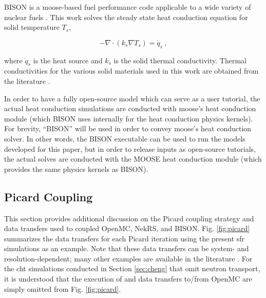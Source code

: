 \documentclass[3p,,preprint,11pt]{elsarticle}
\begin{document}
BISON is a \gls{moose}-based fuel performance code applicable to a wide variety of nuclear fuels \cite{bison}. This work solves the steady state heat conduction equation for solid temperature $T_s$,

\begin{equation}
-\nabla\cdot\left(k_s\nabla T_s\right)=\dot{q}_s\ ,
\end{equation}

\noindent where $\dot{q}_s$ is the heat source and $k_s$ is the solid thermal conductivity. Thermal conductivities for the various solid materials used in this work are obtained from the literature \cite{godbee,powell,bn,tinte,leibowitz,bison}.

In order to have a fully open-source model which can serve as a user tutorial, the actual heat conduction simulations are conducted with \gls{moose}'s heat conduction module (which BISON uses internally for the heat conduction physics kernels). For brevity, ``BISON'' will be used in order to convey \gls{moose}'s heat conduction solver. In other words, the BISON executable can be used to run the models developed for this paper, but in order to release inputs as open-source tutorials, the actual solves are conducted with the MOOSE heat conduction module (which provides the same physics kernels as BISON).

\subsection{Picard Coupling}
\label{sec:picard}


This section provides additional discussion on the Picard coupling strategy and data transfers used to coupled OpenMC, NekRS, and BISON.
Fig. \ref{fig:picard} summarizes the data transfers for each Picard iteration using the present \gls{sfr} simulations as an example. Note that these data transfers can be system- and resolution-dependent; many other examples are available in the literature \cite{huxford,yu_2022,novak2022_cardinal}.
For the \gls{cht} simulations conducted in Section \ref{sec:cheng} that omit neutron transport, it is understood that the execution of and data transfers to/from OpenMC are simply omitted from Fig. \ref{fig:picard}. 
\end{document}
